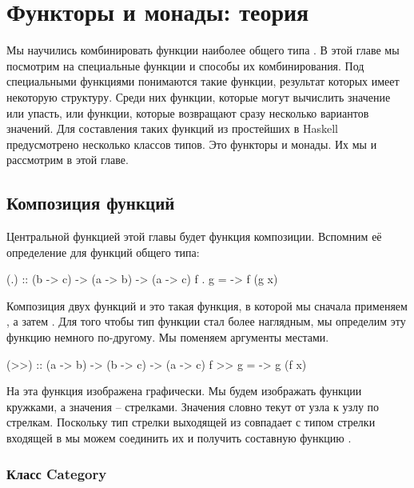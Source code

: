 \setcounter{chapter}{5}
\chapter{Функторы и монады: теория}

Мы научились комбинировать функции наиболее
общего типа . В этой главе мы посмотрим на специальные
функции и способы их комбинирования. Под специальными функциями
понимаются такие функции, результат которых имеет некоторую структуру.
Среди них функции, которые могут вычислить значение или 
упасть, или функции, которые возвращают сразу несколько вариантов значений.
Для составления таких функций из простейших в Haskell
предусмотрено несколько классов типов. Это функторы и монады. 
Их мы и рассмотрим в этой главе.

\section{Композиция функций}

Центральной функцией этой главы будет функция композиции.
Вспомним её определение для функций общего типа:

\begin{code}
(.) :: (b -> c) -> (a -> b) -> (a -> c)
f . g = \x -> f (g x)
\end{code}

Композиция двух функций  и  это такая функция,
в которой мы сначала применяем , а затем .
Для того чтобы тип функции стал более наглядным, мы
определим эту функцию немного по-другому. Мы поменяем 
аргументы местами. 

\begin{code}
(>>) :: (a -> b) -> (b -> c) -> (a -> c)
f >> g = \x -> g (f x)
\end{code}

На  эта функция изображена графически. 
Мы будем изображать функции кружками, а значения -- стрелками.
Значения словно текут от узла к узлу по стрелкам. 
Поскольку тип стрелки выходящей из  совпадает
с типом стрелки входящей в  мы можем соединить их
и получить составную функцию .



\subsection{Класс Category}

